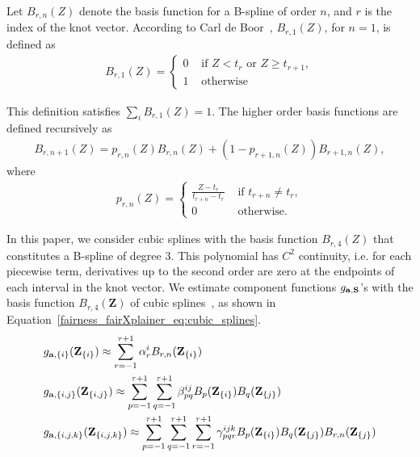 Let $ B_{r, n}(Z) $ denote the basis function for a B-spline of order $ n $, and $ r $ is the index of the knot vector. According to Carl de Boor~\cite{de1971subroutine}, $ B_{r,1}(Z) $, for $ n = 1 $, is defined as
\begin{align*}
B_{r,1}(Z) = 
\begin{cases}
0 &\text{ if } Z < t_r \text{ or } Z \ge t_{r+1},\\
1 &\text{ otherwise}
\end{cases}
\end{align*}

This definition satisfies $ \sum_i B_{r, 1}(Z) = 1 $. The higher order basis functions are defined recursively as
\begin{align*}
	B_{r, n + 1}(Z) = p_{r, n}(Z)B_{r, n}(Z) + (1 - p_{r + 1, n}(Z))B_{r + 1, n}(Z),
\end{align*}
where 
\begin{align*}
p_{r,n}(Z) = 
\begin{cases}
\frac{Z - t_r}{t_{r + n} - t_r} &\text{ if } t_{r + n} \ne t_r,\\
0 &\text{ otherwise.}
\end{cases}
\end{align*}


In this paper, we consider cubic splines with the basis function $ B_{r,4}(Z) $ that constitutes a B-spline of degree $ 3 $. This polynomial has $ C^2 $ continuity, i.e. for each piecewise term, derivatives up to the second order are zero at the endpoints of each interval in the knot vector. We estimate component functions $ g_{\mathbf{a}, \mathbf{S}} $'s with the basis function $ B_{r,4}(\mathbf{Z})  $ of cubic splines~\cite{li2010global}, as shown in Equation~\eqref{fairness_fairXplainer_eq:cubic_splines}.  
\begin{align}\label{fairness_fairXplainer_eq:cubic_splines}
\begin{split}
&g_{\mathbf{a}, \{i\}} (\mathbf{Z}_{\{i\}}) \approx \sum_{r=-1}^{\tau+1}\alpha_r^iB_{r,n}(\mathbf{Z}_{\{i\}})\\
&g_{\mathbf{a}, \{i, j\}} (\mathbf{Z}_{\{i, j\}}) \approx \sum_{p=-1}^{\tau+1}\sum_{q=-1}^{\tau+1}\beta_{pq}^{ij}B_p(\mathbf{Z}_{\{i\}})B_q(\mathbf{Z}_{\{j\}})\\
&g_{\mathbf{a}, \{i, j, k\}} (\mathbf{Z}_{\{i, j, k\}}) \approx \sum_{p=-1}^{\tau+1}\sum_{q=-1}^{\tau+1}\sum_{r=-1}^{\tau+1}\gamma_{pqr}^{ijk}B_p(\mathbf{Z}_{\{i\}})B_q(\mathbf{Z}_{\{j\}})B_{r,n}(\mathbf{Z}_{\{j\}})
\end{split}
\end{align}

